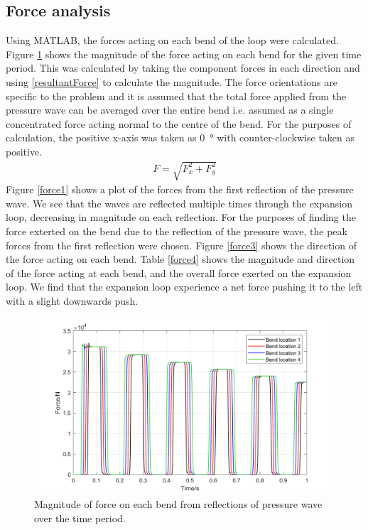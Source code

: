 \subsection{Force analysis}
Using MATLAB, the forces acting on each bend of the loop were calculated. Figure \ref{force2} shows the magnitude of the force acting on each bend for the given time period. This was calculated by taking the component forces in each direction and using \eqref{resultantForce} to calculate the magnitude. The force orientations are specific to the problem and it is assumed that the total force applied from the pressure wave can be averaged over the entire bend i.e. assumed as a single concentrated force acting normal to the centre of the bend. For the purposes of calculation, the positive x-axis was taken as \SI{0}{\degree} with counter-clockwise taken as positive.
\begin{gather}\label{resultantForce}
    F = \sqrt{F_x^2 + F_y^2}
\end{gather}
Figure \ref{force1} shows a plot of the forces from the first reflection of the pressure wave. We see that the waves are reflected multiple times through the expansion loop, decreasing in magnitude on each reflection. For the purposes of finding the force exterted on the bend due to the reflection of the pressure wave, the peak forces from the first reflection were chosen. Figure \ref{force3} shows the direction of the force acting on each bend. Table \ref{force4} shows the magnitude and direction of the force acting at each bend, and the overall force exerted on the expansion loop. We find that the expansion loop experience a net force pushing it to the left with a slight downwards push.

\begin{figure}[H]
    \centering
    \includegraphics[width = 0.9 \textwidth]{img/fig6.png}
    \caption{Magnitude of force on each bend from reflections of pressure wave over the time period.}
    \label{force2}
\end{figure}

